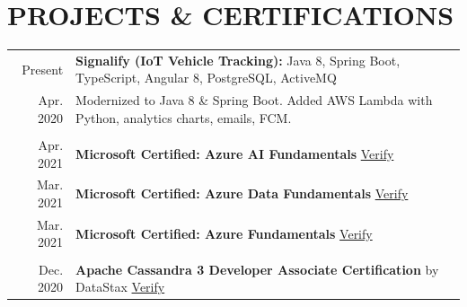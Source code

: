 \documentclass[a4paper, 10pt]{article}
\begin{document}
\section{PROJECTS \& CERTIFICATIONS}
\begin{tabular}{r p{15.7cm}}
	Present &  \textbf{Signalify (IoT Vehicle Tracking):} Java 8, Spring Boot, TypeScript, Angular 8, PostgreSQL, ActiveMQ\\
	Apr. 2020 & Modernized to Java 8 \& Spring Boot. Added AWS Lambda with Python, analytics charts, emails, FCM.\\\\
	Apr. 2021 & \textbf{Microsoft Certified: Azure AI Fundamentals} \hspace{0.5em} \href{https://www.credly.com/badges/b96505f9-33f9-47e0-91bd-2c8fd73ecffb}{Verify}\\
	Mar. 2021 & \textbf{Microsoft Certified: Azure Data Fundamentals} \hspace{0.5em} \href{https://www.credly.com/badges/3cc1890b-1881-48c4-9c25-d960e14fbdee}{Verify}\\
	Mar. 2021 & \textbf{Microsoft Certified: Azure Fundamentals} \hspace{0.5em} \href{https://www.credly.com/badges/18da888a-9cbd-49d8-b923-7c7fe752fbab}{Verify}\\\\
	Dec. 2020 & \textbf{Apache Cassandra 3 Developer Associate Certification} by DataStax \hspace{0.5em} \href{https://certification.mettl.com/datastax/applicant/result/download-certificate?key=v2gAI\%2BtQJaGeWin6S7cSag\%3D\%3D}{Verify}
\end{tabular}
\end{document}
